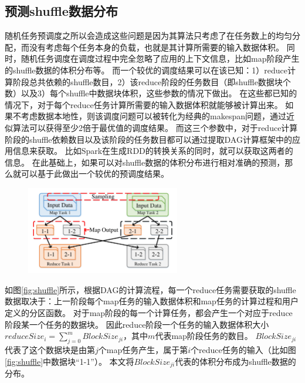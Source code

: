 \subsection{预测shuffle数据分布}

随机任务预调度之所以会造成这些问题是因为其算法只考虑了在任务数上的均匀分配，而没有考虑每个任务本身的负载，也就是其计算所需要的输入数据体积。
同时，随机任务调度在调度过程中完全忽略了应用的上下文信息，比如map阶段产生的shuffle数据的体积分布等。
而一个较优的调度结果可以在该已知：1）reduce计算阶段总共依赖的shuffle数目，2）该reduce阶段的任务数目（即shuffle数据块个数）以及3）每个shuffle中数据块体积，这些参数的情况下做出。
在这些都已知的情况下，对于每个reduce任务计算所需要的输入数据体积就能够被计算出来。
如果不考虑数据本地性，则该调度问题可以被转化为经典的makespan问题，通过近似算法可以获得至少2倍于最优值的调度结果\cite{approximation}。
而这三个参数中，对于reduce计算阶段的shuffle依赖数目以及该阶段的任务数目都可以通过提取DAG计算框架中的应用信息来获取。
比如Spark在生成RDD的转换关系的同时，就可以获取这两者的信息\cite{spark}。
在此基础上，如果可以对shuffle数据的体积分布进行相对准确的预测，那么就可以基于此做出一个较优的预调度结果。

\begin{figure}[!htp]
	\centering
	\includegraphics[width=0.6\textwidth]{../../PPoPP-2018/fig/shuffle.pdf}
\end{figure}

如图\ref{fig:shuffle}所示，根据DAG的计算流程，每一个reduce任务需要获取的shuffle数据取决于：上一阶段每个map任务的输入数据体积和map任务的计算过程和用户定义的分区函数。
对于map阶段的每一个计算任务，都会产生一个对应于reduce阶段某一个任务的数据块。
因此reduce阶段一个任务的输入数据体积大小$reduceSize_i = \sum_{j=0}^{m} {BlockSize_{ji}}$，其中$m$代表map阶段任务的数目。
$BlockSize_{ji}$代表了这个数据块是由第$j$个map任务产生，属于第$i$个reduce任务的输入（比如图\ref{fig:shuffle}中数据块“1-1”）。
本文将$BlockSize_{ji}$代表的体积分布成为shuffle数据的分布。

